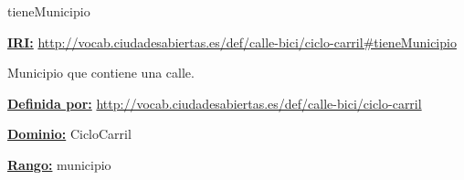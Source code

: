 \begin{mybox}{tieneMunicipio}
\begin{flushleft}
\underline{\textbf{IRI:}}
\url{http://vocab.ciudadesabiertas.es/def/calle-bici/ciclo-carril#tieneMunicipio}
\newline

Municipio que contiene una calle.
\newline

\underline{\textbf{Definida por:}}
\url{http://vocab.ciudadesabiertas.es/def/calle-bici/ciclo-carril}
\newline

\underline{\textbf{Dominio:}}
		CicloCarril
\newline

\underline{\textbf{Rango:}}
		municipio

\end{flushleft}
\end{mybox}


















